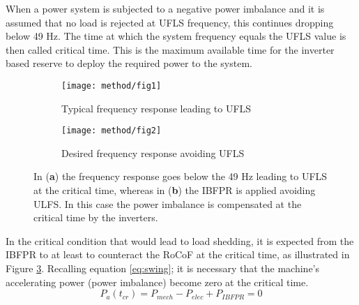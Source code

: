 When a power system is subjected to a negative power imbalance and it is assumed that no load is rejected at UFLS frequency, this continues dropping below 49 Hz. The time at which the system frequency equals the UFLS value is then called critical time. This is the maximum available time for the inverter based reserve to deploy the required power to the system. \\

\begin{figure}[h]
	\centering
	\begin{subfigure}[h]{0.45\textwidth}
		\centering
		\texttt{[image: method/fig1]}
		\caption{Typical frequency response leading to UFLS}
		\label{fig:freqresp_before}
	\end{subfigure}
	\hfill
	\begin{subfigure}[h]{0.45\textwidth}
		\centering
		\texttt{[image: method/fig2]}
		\caption{Desired frequency response avoiding UFLS}
		\label{fig:freqresp_after}
	\end{subfigure}


	\caption{In (\textbf{a}) the frequency response goes below the 49 Hz leading to UFLS at the critical time, whereas in (\textbf{b}) the IBFPR is applied avoiding ULFS. In this case the power imbalance is compensated at the critical time by the inverters.}
\end{figure}

In the critical condition that would lead to load shedding, it is expected from the IBFPR to at least to counteract the RoCoF at the critical time, as illustrated in Figure \ref{fig:freqresp_after}.
Recalling equation \eqref{eq:swing}; it is necessary that the machine’s accelerating power (power imbalance) become zero at the critical time.
\begin{equation}
	\label{eq:powerbalance}
	P_a (t_{cr} )=P_{mech}-P_{elec}+P_{IBFPR}=0
\end{equation}

